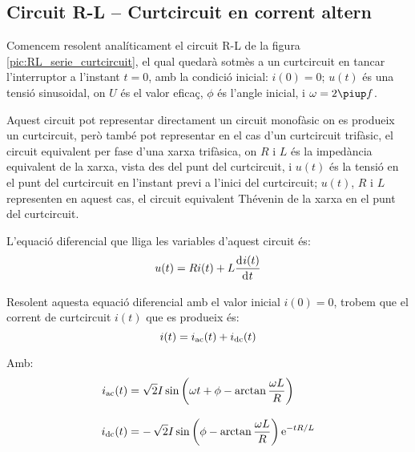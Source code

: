 \subsection {Circuit R-L -- Curtcircuit en corrent altern}\label{sec:ccRL}

Comencem resolent analíticament el circuit R-L de la figura \vref{pic:RL_serie_curtcircuit}, el qual quedarà sotmès a un curtcircuit en tancar l'interruptor a l'instant $t=0$, amb la condició inicial: $i(0) = 0$; $u(t)$ és una tensió sinusoidal, on $U$ és el valor eficaç, $\phi$ és l'angle inicial, i $\omega = 2 \piup f$.

Aquest circuit pot representar directament un circuit monofàsic on es produeix un curtcircuit, però també pot representar en el cas d'un curtcircuit trifàsic,  el circuit equivalent per fase d'una xarxa trifàsica, on $R$ i $L$ és la impedància equivalent de la xarxa, vista des del punt del curtcircuit, i $u(t)$ és la tensió en el punt del curtcircuit en l'instant previ a l'inici del curtcircuit; $u(t)$,  $R$ i $L$ representen en aquest cas, el circuit equivalent Thévenin de la xarxa en el punt del curtcircuit.

\begin{center}
    
    \label{pic:RL_serie_curtcircuit}
\end{center}

L'equació diferencial que lliga les variables d'aquest circuit és:
\begin{equation}
    u(t) = R i(t) + L \deriv{i(t)}{t}
\end{equation}

Resolent aquesta equació diferencial amb el valor inicial $i(0)=0$, trobem que el corrent de curtcircuit $i(t)$  que es produeix  és:
\begin{equation}
    i(t) = i_\mathrm{ac}(t) + i_\mathrm{dc}(t)
    \label{eq:RL_serie_curtcircuit_icc}
\end{equation}

Amb:
\begin{subequations}
\begin{align}
    i_\mathrm{ac}(t) &= \sqrt{2} I \sin\left(\omega t + \phi - \arctan\frac{\omega L}{R}\right) \label{eq:RL_serie_curtcircuit_iac}\\[3mm]
    i_\mathrm{dc}(t) &= -\,\sqrt{2} I\sin\left(\phi - \arctan\frac{\omega L}{R}\right) \mathrm{e}^{-t R/L}\label{eq:RL_serie_curtcircuit_idc}
\end{align}
\end{subequations}


